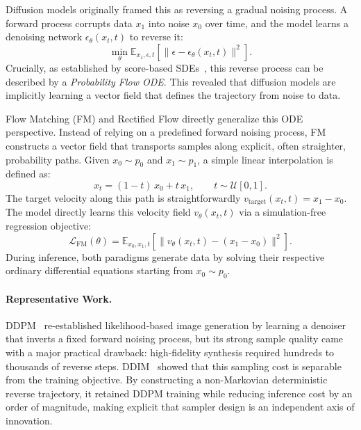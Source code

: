 \documentclass{llmxive}
\begin{document}
Diffusion models originally framed this as reversing a gradual noising process. A forward process corrupts data $x_1$ into noise $x_0$ over time, and the model learns a denoising network $\epsilon_\theta(x_t, t)$ to reverse it:
\begin{equation}
\min_\theta \mathbb{E}_{x_1, \epsilon, t} \left[ \| \epsilon - \epsilon_\theta(x_t, t) \|^2 \right].
\end{equation}
Crucially, as established by score-based SDEs~\citep{song2021scorebasedgenerativemodelingstochastic}, this reverse process can be described by a \emph{Probability Flow ODE}. This revealed that diffusion models are implicitly learning a vector field that defines the trajectory from noise to data.

Flow Matching (FM) and Rectified Flow directly generalize this ODE perspective. Instead of relying on a predefined forward noising process, FM constructs a vector field that transports samples along explicit, often straighter, probability paths. Given $x_0 \sim p_0$ and $x_1 \sim p_1$, a simple linear interpolation is defined as:
\begin{equation}
x_t = (1 - t)\, x_0 + t\, x_1, \qquad t \sim \mathcal{U}[0,1].
\end{equation}
The target velocity along this path is straightforwardly $v_{\text{target}}(x_t, t) = x_1 - x_0$. The model directly learns this velocity field $v_\theta(x_t,t)$ via a simulation-free regression objective:
\begin{equation}
\mathcal{L}_{\text{FM}}(\theta) = \mathbb{E}_{x_0, x_1, t} \left[ \bigl\| v_\theta(x_t, t) - (x_1 - x_0) \bigr\|^2 \right].
\end{equation}
During inference, both paradigms generate data by solving their respective ordinary differential equations starting from $x_0 \sim p_0$.

\paragraph{Representative Work.}
DDPM~\citep{ho2020denoising} re-established likelihood-based image generation by learning a denoiser that inverts a fixed forward noising process, but its strong sample quality came with a major practical drawback: high-fidelity synthesis required hundreds to thousands of reverse steps. DDIM~\citep{songDDIM} showed that this sampling cost is separable from the training objective. By constructing a non-Markovian deterministic reverse trajectory, it retained DDPM training while reducing inference cost by an order of magnitude, making explicit that sampler design is an independent axis of innovation.
\end{document}
